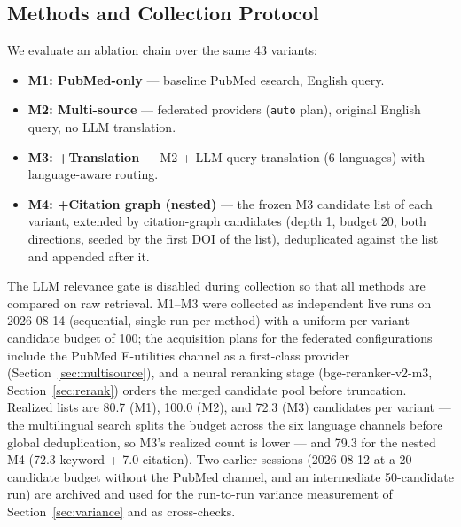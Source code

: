 \documentclass[sigconf,screen]{acmart}
\begin{document}
\subsection{Methods and Collection Protocol}
\label{sec:protocol}

We evaluate an ablation chain over the same 43 variants:

\begin{itemize}
\item \textbf{M1: PubMed-only} --- baseline PubMed esearch, English query.
\item \textbf{M2: Multi-source} --- federated providers
(\texttt{auto} plan), original English query, no LLM translation.
\item \textbf{M3: +Translation} --- M2 + LLM query translation
(6 languages) with language-aware routing.
\item \textbf{M4: +Citation graph (nested)} --- the frozen M3 candidate
list of each variant, extended by citation-graph candidates
(depth 1, budget 20, both directions, seeded by the first DOI of the
list), deduplicated against the list and appended after it.
\end{itemize}

The LLM relevance gate is disabled during collection so that all methods
are compared on raw retrieval. M1--M3 were collected as independent live
runs on 2026-08-14 (sequential, single run per method) with a uniform
per-variant candidate budget of 100; the acquisition plans for the
federated configurations include the PubMed E-utilities channel as a
first-class provider (Section~\ref{sec:multisource}), and a neural
reranking stage (bge-reranker-v2-m3, Section~\ref{sec:rerank}) orders the
merged candidate pool before truncation. Realized lists are 80.7 (M1),
100.0 (M2), and 72.3 (M3) candidates per variant --- the multilingual
search splits the budget across the six language channels before global
deduplication, so M3's realized count is lower --- and 79.3 for the nested
M4 (72.3 keyword + 7.0 citation). Two earlier sessions (2026-08-12 at a
20-candidate budget without the PubMed channel, and an intermediate
50-candidate run) are archived and used for the run-to-run variance
measurement of Section~\ref{sec:variance} and as cross-checks.
\end{document}
